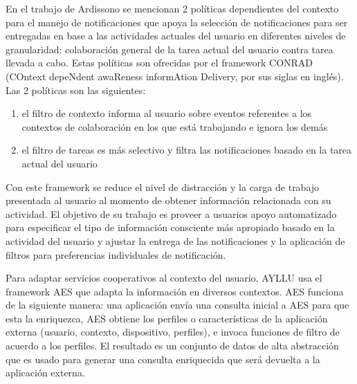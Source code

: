 En el trabajo de Ardissono \cite{ardissono2012context} se mencionan 2 pol\'iticas dependientes del contexto para el manejo de notificaciones que apoya la selecci\'on de notificaciones para ser entregadas en base a las actividades actuales del usuario en diferentes niveles de granularidad: colaboraci\'on general de la tarea actual del usuario contra tarea llevada a cabo. Estas pol\'iticas son ofrecidas por el framework CONRAD (COntext depeNdent awaReness informAtion Delivery, por sus siglas en ingl\'es). Las 2 pol\'iticas son las siguientes:
\begin{enumerate}
\item el filtro de contexto informa al usuario sobre eventos referentes a los contextos de colaboraci\'on en los que est\'a trabajando e ignora los dem\'as
\item el filtro de tareas es m\'as selectivo y filtra las notificaciones basado en la tarea actual del usuario
\end{enumerate}
Con este framework se reduce el nivel de distracci\'on y la carga de trabajo presentada al usuario al momento de obtener informaci\'on relacionada con su actividad.
El objetivo de su trabajo es proveer a usuarios apoyo automatizado para especificar el tipo de informaci\'on consciente m\'as apropiado basado en la actividad del usuario y ajustar la entrega de las notificaciones y la aplicaci\'on de filtros para preferencias individuales de notificaci\'on.

Para adaptar servicios cooperativos al contexto del usuario, AYLLU \cite{arias2012platform} usa el framework AES que adapta la informaci\'on en diversos contextos. AES funciona de la siguiente manera: una aplicaci\'on env\'ia una consulta inicial a AES para que esta la enriquezca, AES obtiene los perfiles o caracter\'isticas de la aplicaci\'on externa (usuario, contexto, dispositivo, perfiles), e invoca funciones de filtro de acuerdo a los perfiles. El resultado es un conjunto de datos de alta abstracci\'on que es usado para generar una consulta enriquecida que ser\'a devuelta a la aplicaci\'on externa.

